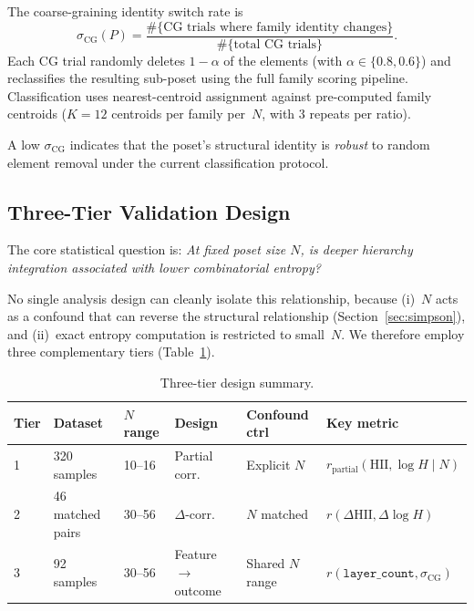 \documentclass[entropy,article,submit,pdftex,moreauthors]{Definitions/mdpi}
\begin{document}
The coarse-graining identity switch rate is
\begin{equation}
    \sigma_{\text{CG}}(P) = \frac{\#\{\text{CG trials where family identity changes}\}}{\#\{\text{total CG trials}\}}.
    \label{eq:sigma_cg}
\end{equation}
Each CG trial randomly deletes $1 - \alpha$ of the elements (with $\alpha \in \{0.8, 0.6\}$) and reclassifies the resulting sub-poset using the full family scoring pipeline. Classification uses nearest-centroid assignment against pre-computed family centroids ($K = 12$ centroids per family per~$N$, with 3 repeats per ratio).

A low $\sigma_{\text{CG}}$ indicates that the poset's structural identity is \emph{robust} to random element removal under the current classification protocol.

\subsection{Three-Tier Validation Design}

The core statistical question is: \emph{At fixed poset size $N$, is deeper hierarchy integration associated with lower combinatorial entropy?}

No single analysis design can cleanly isolate this relationship, because (i)~$N$ acts as a confound that can reverse the structural relationship (Section~\ref{sec:simpson}), and (ii)~exact entropy computation is restricted to small~$N$. We therefore employ three complementary tiers (Table~\ref{tab:tiers}).

\begin{table}[H]
\caption{Three-tier design summary.\label{tab:tiers}}
\begin{tabular}{llllll}
\toprule
\textbf{Tier} & \textbf{Dataset} & \boldmath$N$ \textbf{range} & \textbf{Design} & \textbf{Confound ctrl} & \textbf{Key metric} \\
\midrule
1 & 320 samples & 10--16 & Partial corr. & Explicit $N$ & $r_\text{partial}(\text{HII}, \log H \mid N)$ \\
2 & 46 matched pairs & 30--56 & $\Delta$-corr. & $N$ matched & $r(\Delta\text{HII}, \Delta\log H)$ \\
3 & 92 samples & 30--56 & Feature $\to$ outcome & Shared $N$ range & $r(\texttt{layer\_count}, \sigma_\text{CG})$ \\
\bottomrule
\end{tabular}
\end{table}
\end{document}
